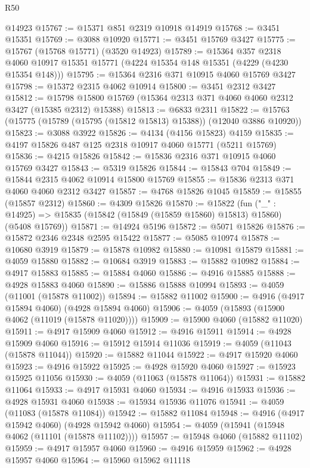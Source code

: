 \begin{lexlean}{R50}
\begin{coremodule}
    @14923
@15767 := @15371 @851 @2319 @10918 @14919
@15768 := @3451 @15351
@15769 := @3088 @10920
@15771 := @3451 @15769 @3427
@15775 := @15767 (@15768 @15771) (@3520 @14923)
@15789 := @15364
    @357
    @2318
    @4060
    @10917
    @15351
    @15771
    (@4224 @15354 @148 @15351 (@4229 (@4230 @15354 @148)))
@15795 := @15364 @2316 @371 @10915 @4060 @15769 @3427
@15798 := @15372 @2315 @4062 @10914
@15800 := @3451 @2312 @3427
@15812 := @15798 @15800 @15769 (@15364 @2313 @371 @4060 @4060 @2312 @3427 (@15385 @2312) @15388)
@15813 := @6833 @2311
@15822 := @15763 (@15775 (@15789 (@15795 (@15812 @15813) @15388)) (@12040 @3886 @10920))
@15823 := @3088 @3922
@15826 := @4134 (@4156 @15823) @4159
@15835 := @4197 @15826 @487 @125 @2318 @10917 @4060 @15771 (@5211 @15769)
@15836 := @4215 @15826
@15842 := @15836 @2316 @371 @10915 @4060 @15769 @3427
@15843 := @5319 @15826
@15844 := @15843 @704
@15849 := @15844 @2315 @4062 @10914 @15800 @15769
@15855 := @15836 @2313 @371 @4060 @4060 @2312 @3427
@15857 := @4768 @15826 @1045
@15859 := @15855 (@15857 @2312)
@15860 := @4309 @15826
@15870 := @15822
    (fun ("_" : @14925) => @15835 (@15842 (@15849 (@15859 @15860) @15813) @15860) (@5408 @15769))
@15871 := @14924 @5196
@15872 := @5071 @15826
@15876 := @15872 @2346 @2348 @2595 @15422
@15877 := @5085 @10974
@15878 := @10680 @3919
@15879 := @15878 @10982
@15880 := @10981 @15879
@15881 := @4059 @15880
@15882 := @10684 @3919
@15883 := @15882 @10982
@15884 := @4917 @15883
@15885 := @15884 @4060
@15886 := @4916 @15885
@15888 := @4928 @15883 @4060
@15890 := @15886 @15888 @10994
@15893 := @4059 (@11001 (@15878 @11002))
@15894 := @15882 @11002
@15900 := @4916 (@4917 @15894 @4060) (@4928 @15894 @4060)
@15906 := @4059 (@15893 (@15900 @4062 (@11019 (@15878 @11020))))
@15909 := @15900 @4060 (@15882 @11020)
@15911 := @4917 @15909 @4060
@15912 := @4916 @15911
@15914 := @4928 @15909 @4060
@15916 := @15912 @15914 @11036
@15919 := @4059 (@11043 (@15878 @11044))
@15920 := @15882 @11044
@15922 := @4917 @15920 @4060
@15923 := @4916 @15922
@15925 := @4928 @15920 @4060
@15927 := @15923 @15925 @11056
@15930 := @4059 (@11063 (@15878 @11064))
@15931 := @15882 @11064
@15933 := @4917 @15931 @4060
@15934 := @4916 @15933
@15936 := @4928 @15931 @4060
@15938 := @15934 @15936 @11076
@15941 := @4059 (@11083 (@15878 @11084))
@15942 := @15882 @11084
@15948 := @4916 (@4917 @15942 @4060) (@4928 @15942 @4060)
@15954 := @4059 (@15941 (@15948 @4062 (@11101 (@15878 @11102))))
@15957 := @15948 @4060 (@15882 @11102)
@15959 := @4917 @15957 @4060
@15960 := @4916 @15959
@15962 := @4928 @15957 @4060
@15964 := @15960 @15962 @11118

\end{coremodule}
\end{lexlean}
